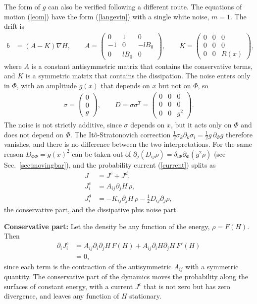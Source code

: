 \documentclass[11pt]{article}
\begin{document}
The form of $g$ can also be verified following a different route. 
The equations of motion (\ref{eom}) have the form (\ref{langevin}) with a single white noise, $m=1$. The drift is
\begin{align}
  b&=(A-K)\nabla H,\qquad
  A=\begin{pmatrix}0&1&0\\-1&0&-lB_0\\0&lB_0&0\end{pmatrix},\qquad
  K=\begin{pmatrix}0&0&0\\0&0&0\\0&0&R(x)\end{pmatrix},
\end{align}
where $A$ is a constant antisymmetric matrix that contains the conservative terms, and $K$ is a symmetric matrix that contains the dissipation. The noise enters only in $\Phi$, with an amplitude $g(x)$ that depends on $x$ but not on $\Phi$, so
\begin{align}
  \sigma=\begin{pmatrix}0\\0\\g\end{pmatrix},\qquad
  D=\sigma\sigma^T=\begin{pmatrix}0&0&0\\0&0&0\\0&0&g^2\end{pmatrix}.
\end{align}
The noise is not strictly additive, since $\sigma$ depends on $x$, but it acts only on $\Phi$ and does not depend on $\Phi$. The It\^o-Stratonovich correction $\frac{1}{2}\sigma_k\partial_k\sigma_i=\frac{1}{2}g\,\partial_\Phi g$ therefore vanishes, and there is no difference between the two interpretations. For the same reason $D_{\Phi\Phi}=g(x)^2$ can be taken out of $\partial_j(D_{ij}\rho)=\delta_{i\Phi}\partial_\Phi(g^2\rho)$ (see Sec.~\ref{sec:movingbar}), and the probability current (\ref{current}) splits as
\begin{align}
  J&=J^c+J^d,\nonumber\\
  J^c_i&=A_{ij}\partial_jH\,\rho,\nonumber\\
  J^d_i&=-K_{ij}\partial_jH\,\rho-\frac{1}{2}D_{ij}\partial_j\rho,
\end{align}
the conservative part, and the dissipative plus noise part.

{\bf Conservative part:} Let the density be any function of the energy, $\rho=F(H)$. Then
\begin{align}
  \partial_iJ^c_i&=A_{ij}\partial_i\partial_jH\,F(H)+A_{ij}\partial_iH\partial_jH\,F'(H)\nonumber\\
  &=0,
\end{align}
since each term is the contraction of the antisymmetric $A_{ij}$ with a symmetric quantity. The conservative part of the dynamics moves the probability along the surfaces of constant energy, with a current $J^c$ that is not zero but has zero divergence, and leaves any function of $H$ stationary.
\end{document}
